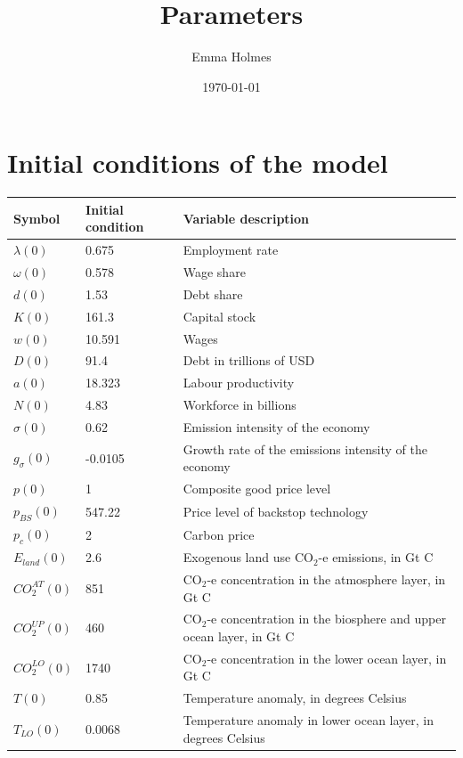\documentclass{article}[12 pt]
\begin{document}
\title{Parameters}
\author{Emma Holmes}
\date{\today}

\maketitle

\section{Initial conditions of the model}
\onehalfspacing
\begin{center}
\begin{tabular}{ l l l} 
\hline
Symbol & Initial condition & Variable description \\
\hline
$\lambda(0)$ & 0.675 & Employment rate \\
$\omega(0)$ & 0.578 & Wage share  \\
$d(0)$ & 1.53 & Debt share \\
\hline 
$K(0)$ & 161.3 & Capital stock \\
$w(0)$ & 10.591 & Wages \\
$D(0)$ & 91.4 & Debt in trillions of USD\\
$a(0)$ & 18.323 & Labour productivity \\ 
$N(0)$ & 4.83 & Workforce in billions \\
$\sigma(0)$ & 0.62 &  Emission intensity of the economy \\
$g_{\sigma}(0)$ & -0.0105 & Growth rate of the emissions intensity of the economy  \\
$p(0)$ & 1 & Composite good price level \\
$p_{BS}(0)$ & 547.22 & Price level of backstop technology  \\
$p_{c}(0)$ & 2 & Carbon price  \\
$E_{land}(0)$ & 2.6 & Exogenous land use CO$_2$-e emissions, in Gt C  \\
$CO_2^{AT}(0)$ & 851 & CO$_2$-e concentration in the atmosphere layer, in Gt C \\
$CO_2^{UP}(0)$ & 460 & CO$_2$-e concentration in the biosphere and upper ocean layer, in Gt C \\
$CO_2^{LO}(0)$ & 1740 & CO$_2$-e concentration in the lower ocean layer, in Gt C  \\
$T(0)$ & 0.85 & Temperature anomaly, in degrees Celsius  \\
$T_{LO}(0)$ & 0.0068 & Temperature anomaly in lower ocean layer, in degrees Celsius \\
\hline
\end{tabular}
\end{center}
\end{document}
